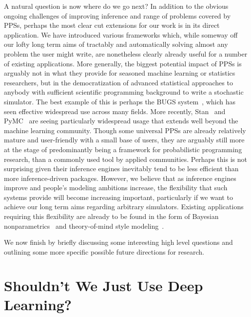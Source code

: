 A natural question is now where do we go next?  In addition to the obvious ongoing challenges
of improving inference and range of problems covered by PPSs, perhaps the most clear cut 
extensions for our
work is in its direct application.  We have introduced various frameworks which, while someway off
our lofty long term aims of tractably and automatically solving almost any problem the 
user might write, are nonetheless clearly already useful for a number of existing applications.  
More generally, the biggest
potential impact of PPSs is arguably not in what they provide for seasoned machine learning or 
statistics researchers, but in the democratization of advanced statistical approaches to anybody with sufficient
scientific programming background to write a stochastic simulator.  The best example of this is
perhaps the BUGS system~\cite{spiegelhalter1996bugs}, which has seen effective widespread use across
many fields.
More recently, Stan~\citep{carpenter2015stan} and PyMC~\citep{salvatier2016probabilistic} 
are seeing particularly widespread usage that extends well beyond
the machine learning community.  Though some universal PPSs are already relatively 
mature and user-friendly with a small base of users, they are arguably still more
at the stage of predominantly being a framework for probabilistic programming
research, than a commonly used tool by applied communities.  Perhaps this is not surprising given
their inference engines inevitably tend to be less efficient than more inference-driven packages.
However, we believe that as inference engines improve and people's modeling ambitions
increase, the flexibility that such systems provide will become increasing important,
particularly if we want to achieve our long term aims regarding arbitrary simulators.
Existing applications requiring this flexibility are already to be found in the form of Bayesian
nonparametrics~\citep{dhir2017interpreting} and theory-of-mind style 
modeling~\citep{stuhlmuller2014reasoning}.

We now finish by briefly discussing some interesting high level questions and 
outlining some more specific possible future directions for research. 

\section{Shouldn't We Just Use Deep Learning?}

